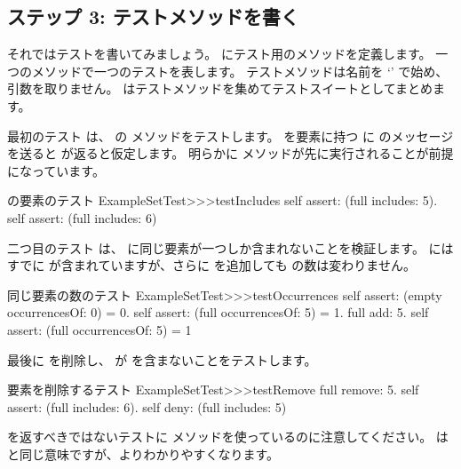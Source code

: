 \documentclass[a4paper,10pt,twoside]{book}
\begin{document}

\subsection{ステップ 3: テストメソッドを書く}

それではテストを書いてみましょう。
 にテスト用のメソッドを定義します。
一つのメソッドで一つのテストを表します。
テストメソッドは名前を `' で始め、引数を取りません。
\sunit はテストメソッドを集めてテストスイートとしてまとめます。


最初のテスト  は、  の  メソッドをテストします。
 を要素に持つ  に  のメッセージを送ると  が返ると仮定します。
明らかに  メソッドが先に実行されることが前提になっています。

\begin{method}[testIncludes]{ の要素のテスト}
ExampleSetTest>>>testIncludes
	self assert: (full includes: 5).
	self assert: (full includes: 6)
\end{method}

二つ目のテスト  は、  に同じ要素が一つしか含まれないことを検証します。  にはすでに  が含まれていますが、さらに  を追加しても  の数は変わりません。

\begin{method}[testOccurrences]{同じ要素の数のテスト}
ExampleSetTest>>>testOccurrences
	self assert: (empty occurrencesOf: 0) = 0.
	self assert: (full occurrencesOf: 5) = 1.
	full add: 5.
	self assert: (full occurrencesOf: 5) = 1
\end{method}

最後に  を削除し、  が  を含まないことをテストします。

\begin{method}[testRemove]{要素を削除するテスト}
ExampleSetTest>>>testRemove
	full remove: 5.
	self assert: (full includes: 6).
	self deny: (full includes: 5)
\end{method}

\noindent
{} を返すべきではないテストに  メソッドを使っているのに注意してください。
 は  と同じ意味ですが、よりわかりやすくなります。
\end{document}
